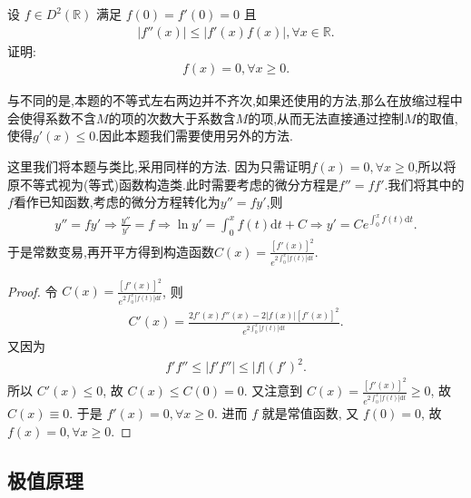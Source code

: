 \documentclass[../../main.tex]{subfiles}
\begin{document}
\begin{example}
设 $f\in D^2(\mathbb{R})$ 满足 $f(0)=f'(0)=0$ 且
\begin{align*}
|f''(x)|\leqslant|f'(x)f(x)|,\forall x\in\mathbb{R}.
\end{align*}
证明:
\begin{align*}
f(x)=0,\forall x\geqslant 0.
\end{align*} 
\end{example}
\begin{remark}
与不同的是,本题的不等式左右两边并不齐次,如果还使用的方法,那么在放缩过程中会使得系数不含$M$的项的次数大于系数含$M$的项,从而无法直接通过控制$M$的取值,使得$g'(x)\leqslant 0$.因此本题我们需要使用另外的方法.

这里我们将本题与类比,采用同样的方法. 因为只需证明$f(x)=0,\forall x\geqslant 0$,所以将原不等式视为(等式)函数构造类.此时需要考虑的微分方程是$f''=ff'$.我们将其中的$f$看作已知函数,考虑的微分方程转化为$y''=fy'$,则
\begin{align*}
y'' =fy' \Rightarrow \frac{y''}{y'}=f\Rightarrow \ln y' =\int_0^x{f\left( t \right) \mathrm{d}t}+C\Rightarrow y' =Ce^{\int_0^x{f\left( t \right) \mathrm{d}t}}.
\end{align*}
于是常数变易,再开平方得到构造函数$C\left( x \right) =\frac{\left[ f'\left( x \right) \right] ^2}{e^{2\int_0^x{|f\left( t \right)| \mathrm{d}t}}}.$
\end{remark}
\begin{proof}
令 $C(x)=\frac{[f'(x)]^2}{e^{2\int_0^x{|f(t)|\mathrm{d}t}}}$, 则
\begin{align*}
C'(x)=\frac{2f'(x)f''(x)-2|f(x)|[f'(x)]^2}{e^{2\int_0^x{|f(t)|\mathrm{d}t}}}.
\end{align*}
又因为
\begin{align*}
f'f''\leqslant|f'f''|\leqslant|f|(f')^2.
\end{align*}
所以 $C'(x)\leqslant0$, 故 $C(x)\leqslant C(0)=0$. 又注意到 $C(x)=\frac{[f'(x)]^2}{e^{2\int_0^x{|f(t)|\mathrm{d}t}}}\geqslant0$, 故 $C(x)\equiv0$. 于是 $f'(x)=0,\forall x\geqslant0$.
进而 $f$ 就是常值函数, 又 $f(0)=0$, 故 $f(x)=0,\forall x\geqslant0$. 
\end{proof}


\subsection{极值原理}
\end{document}

